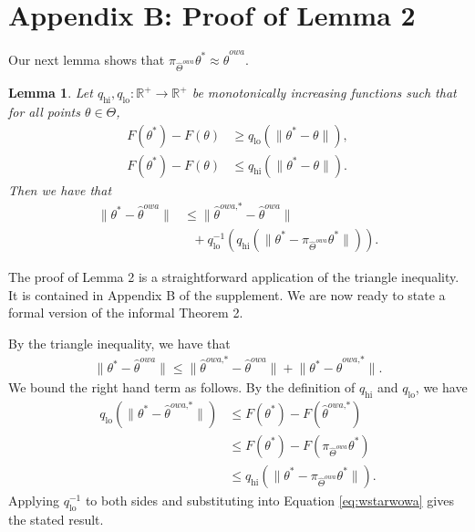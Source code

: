 \documentclass[twoside]{article}
\newtheorem{lemma}{Lemma}
\newcommand{\qhi}{q_\text{hi}}
\newcommand{\qlo}{q_\text{lo}}
\newcommand{\W}{{\hat \Theta^{\textit{owa}}}}
\newcommand{\w}{\theta}
\newcommand{\wowa}{\hat\w^{owa}}
\newcommand{\wowastar}{\hat\w^{\textit{owa,*}}}
\newcommand{\wstar}{{\w^{*}}}
\newcommand{\ltwo}[1]{{\lVert {#1} \rVert}}
\newcommand{\proj}[1]{\pi_{{#1}}}
\begin{document}

\section*{Appendix B: Proof of Lemma 2}

Our next lemma shows that $\proj{\W}\wstar \approx \wowa$.

\begin{lemma}
Let $\qhi,\qlo : \mathbb{R}^+ \to \mathbb{R}^+$ be monotonically increasing functions such that for all points $\w\in\Theta$,
\begin{align}
F(\wstar) - F(\w) &\ge \qlo \left( \ltwo {\wstar - \w} \right)
,
\\
F(\wstar) - F(\w) &\le \qhi \left( \ltwo {\wstar - \w} \right)
.
\end{align}
Then we have that
\begin{equation}
\begin{aligned}
\ltwo {\wstar-\wowa}
&\le
\ltwo{\wowastar-\wowa}
\\
&~~~+
\qlo^{-1} \left(
    \qhi \left( \ltwo {\wstar - \proj\W\wstar} \right)
\right)
.
\label{eq:lemma2res}
\end{aligned}
\end{equation}
\end{lemma}

The proof of Lemma 2 is a straightforward application of the triangle inequality.
It is contained in Appendix B of the supplement.
We are now ready to state a formal version of the informal Theorem 2.

By the triangle inequality, we have that
\begin{align}
\ltwo{\wstar-\wowa}
\le
\ltwo{\wowastar-\wowa}
+
\ltwo{\wstar-\wowastar}
.
\label{eq:wstarwowa}
\end{align}
We bound the right hand term as follows.
By the definition of $\qhi$ and $\qlo$, we have
\begin{align}
\qlo \left( \ltwo {\wstar-\wowastar} \right)
&\le F(\wstar) - F(\wowastar)
\\
&\le F(\wstar) - F(\proj\W\wstar)
\\
&\le \qhi \left( \ltwo {\wstar - \proj\W\wstar} \right)
.
\end{align}
Applying $\qlo^{-1}$ to both sides and substituting into Equation \ref{eq:wstarwowa} gives the stated result.
\end{document}
